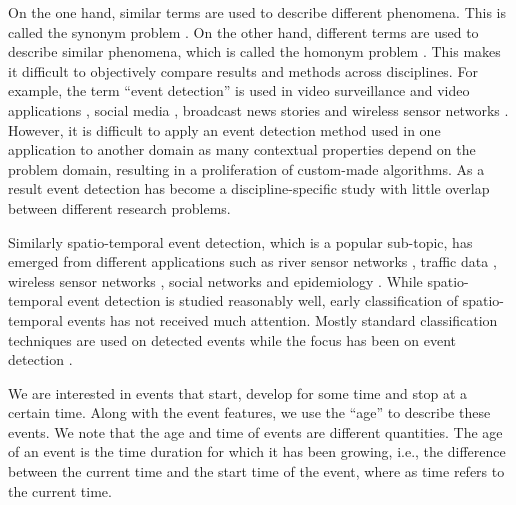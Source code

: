 \documentclass[a4paper,11pt]{article}
\begin{document}
On the one hand, similar terms are used to describe different phenomena. This is called the synonym problem \cite{zhou2014spatiotemporal}. On the other hand, different terms are used to describe similar phenomena, which is called the homonym problem \cite{zhou2014spatiotemporal}. This makes it difficult to objectively compare results and methods across disciplines. For example, the term ``event detection'' is used in video surveillance and video applications \cite{adam2008robust, ke2005efficient, medioni2001event}, social media \cite{weng2011event, li2012tedas, abdelhaq2013eventweet}, broadcast news stories \cite{allan1998line, li2005probabilistic} and wireless sensor networks \cite{yin2009spatio, mao2015online}. However, it is difficult to apply an event detection method used in one application to another domain as many contextual properties depend on the problem domain, resulting in a proliferation of custom-made algorithms. As a result event detection has become a discipline-specific study with little overlap between different research problems.

Similarly spatio-temporal event detection, which is a popular sub-topic, has emerged from different applications such as river sensor networks \cite{mao2015online}, traffic data \cite{souto2016event}, wireless sensor networks \cite{mousavi2013spatio}, social networks \cite{cheng2014event} and epidemiology \cite{gomide2011dengue}. While spatio-temporal event detection is studied reasonably well, early classification of spatio-temporal events has not received much attention. Mostly standard classification techniques are used on detected events while the focus has been on event detection \cite{kang2014detecting}.


We are interested in events that start, develop for some time and stop at a certain time. Along with the event features, we use the ``age'' to describe these events. We note that the age and time of events are different quantities. The age of an event is the time duration for which it has been growing, i.e., the difference between the current time and the start time of the event, where as time refers to the current time.
\end{document}
